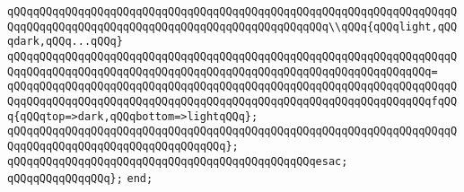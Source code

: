 \newline
\verb|qQQqqQQqqQQqqQQqqQQqqQQqqQQqqQQqqQQqqQQqqQQqqQQqqQQqqQQqqQQqqQQqqQQqqQQqqQQqqQQqqQQqqQQqqQQqqQQqqQQqqQQqqQQqqQQqqQQqqQQq\\qQQq{qQQqlight,qQQqdark,qQQq...qQQq}|\newline
\verb|qQQqqQQqqQQqqQQqqQQqqQQqqQQqqQQqqQQqqQQqqQQqqQQqqQQqqQQqqQQqqQQqqQQqqQQqqQQqqQQqqQQqqQQqqQQqqQQqqQQqqQQqqQQqqQQqqQQqqQQqqQQqqQQqqQQqqQQq=|\newline
\verb|qQQqqQQqqQQqqQQqqQQqqQQqqQQqqQQqqQQqqQQqqQQqqQQqqQQqqQQqqQQqqQQqqQQqqQQqqQQqqQQqqQQqqQQqqQQqqQQqqQQqqQQqqQQqqQQqqQQqqQQqqQQqqQQqqQQqqQQqfqQQq{qQQqtop=>dark,qQQqbottom=>lightqQQq};|\newline
\verb|qQQqqQQqqQQqqQQqqQQqqQQqqQQqqQQqqQQqqQQqqQQqqQQqqQQqqQQqqQQqqQQqqQQqqQQqqQQqqQQqqQQqqQQqqQQqqQQqqQQqqQQq};|\newline
\verb|qQQqqQQqqQQqqQQqqQQqqQQqqQQqqQQqqQQqqQQqqQQqqQQqesac;|\newline
\verb|qQQqqQQqqQQqqQQq};|\newline
\verb|end;|\newline
\newline
\newline

